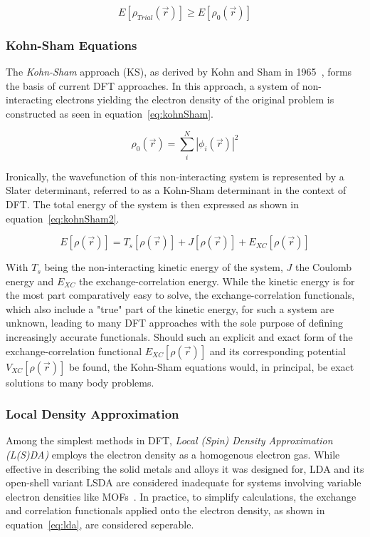 \documentclass[11pt]{article}
\begin{document}
\begin{equation}
  E[\rho_{Trial}(\vec{r})] \geq E[\rho_{0}(\vec{r})]
  \label{eq:hohenbergKohn}
\end{equation}



\subsubsection{Kohn-Sham Equations}\label{kohnSham}

The \textit{Kohn-Sham} approach (KS), as derived by Kohn and Sham in 1965~\cite{Kohn1965}, forms the basis of current DFT approaches. 
In this approach, a system of non-interacting electrons yielding the electron density of the original problem is constructed as seen in equation~\ref{eq:kohnSham}.

\begin{equation}
  \rho_0(\vec{r}) = \sum_{i}^{N}|\phi_i(\vec{r})|^2
  \label{eq:kohnSham}
\end{equation}

\bigskip

\noindent Ironically, the wavefunction of this non-interacting system is represented by a Slater determinant, referred to as a Kohn-Sham determinant in the context of DFT.
The total energy of the system is then expressed as shown in equation~\ref{eq:kohnSham2}.

\begin{equation}
  E[\rho(\vec{r})] = T_s[\rho(\vec{r})] + J[\rho(\vec{r})] + E_{XC}[\rho(\vec{r})]
  \label{eq:kohnSham2}
\end{equation}

\bigskip

\noindent With $T_s$ being the non-interacting kinetic energy of the system, $J$ the Coulomb energy and $E_{XC}$ the exchange-correlation energy.
While the kinetic energy is for the most part comparatively easy to solve, the exchange-correlation functionals, which also include a "true" part of the kinetic energy, for such a system are unknown, leading to many DFT approaches with the sole purpose of defining increasingly accurate functionals.
Should such an explicit and exact form of the exchange-correlation functional $E_{XC}[\rho(\vec{r})]$ and its corresponding potential $V_{XC}[\rho(\vec{r})]$ be found, the Kohn-Sham equations would, in principal, be exact solutions to many body problems.

\subsubsection{Local Density Approximation}
Among the simplest methods in DFT, \textit{Local (Spin) Density Approximation (L(S)DA)} employs the electron density as a homogenous electron gas.
While effective in describing the solid metals and alloys it was designed for, LDA and its open-shell variant LSDA are considered inadequate for systems involving variable electron densities like MOFs~\cite{Perdew1981}.
In practice, to simplify calculations, the exchange and correlation functionals applied onto the electron density, as shown in equation~\ref{eq:lda}, are considered seperable.
\end{document}
